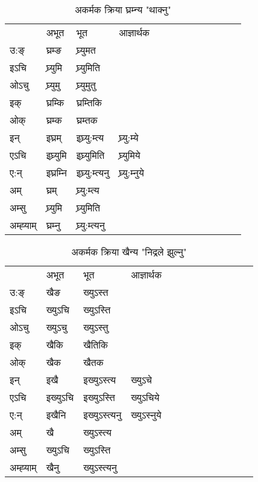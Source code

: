 \begin{table}[H]
\centering
\caption{\label{um.vi} अकर्मक क्रिया  घ्रम्‍न्य  "थाक्नु"  }
\begin{tabular}{l|l|l|l|l|l|l|l|l|l|l|l|l}  \toprule
&अभूत & भूत & आज्ञार्थक \\ 
उ:ङ्‌ &घ्रम्ङ &घ्र्युमत \\ 
इऽचि &घ्र्युमि &घ्र्युमिति   \\ 
ओऽचु &घ्र्युमु &घ्र्युमुतु   \\ 
इक् &घ्रम्कि &घ्रम्तिकि   \\ 
ओक् &घ्रम्क &घ्रम्तक   \\ 
इन् & इघ्रम् & इघ्र्यु:म्त्य &घ्र्यु:म्ये  \\ 
एऽचि & इघ्र्युमि & इघ्र्युमिति &घ्र्युमिये    \\ 
ए:न् & इघ्रम्‍नि  & इघ्र्यु:म्त्यनु &घ्र्यु:म्‍नुये  \\ 
अम् & घ्रम् & घ्र्यु:म्त्य   \\ 
अम्सु & घ्र्युमि & घ्र्युमिति   \\ 
अम्ह्‍याम् & घ्रम्‍नु  & घ्र्यु:म्त्यनु \\ 
\bottomrule
\end{tabular}
\end{table}


\begin{table}[H]
\centering
\caption{\label{un.vi} अकर्मक क्रिया  खैन्य  "निद्रले झुल्नु"  }
\begin{tabular}{l|l|l|l|l|l|l|l|l|l|l|l|l}  \toprule
&अभूत & भूत & आज्ञार्थक \\ 
उ:ङ्‌ &खैङ &ख्युऽस्त \\ 
इऽचि &ख्युऽचि &ख्युऽस्ति   \\ 
ओऽचु &ख्युऽचु &ख्युऽस्तु   \\ 
इक् &खैकि &खैतिकि   \\ 
ओक् &खैक &खैतक   \\ 
इन् & इखै & इख्युऽस्त्य &ख्युऽचे  \\ 
एऽचि & इख्युऽचि & इख्युऽस्ति &ख्युऽचिये    \\ 
ए:न् & इखैनि  & इख्युऽस्त्यनु &ख्युऽस्‍नुये  \\ 
अम् & खै & ख्युऽस्त्य   \\ 
अम्सु & ख्युऽचि & ख्युऽस्ति   \\ 
अम्ह्‍याम् & खैनु  & ख्युऽस्त्यनु \\ 
\bottomrule
\end{tabular}
\end{table}


